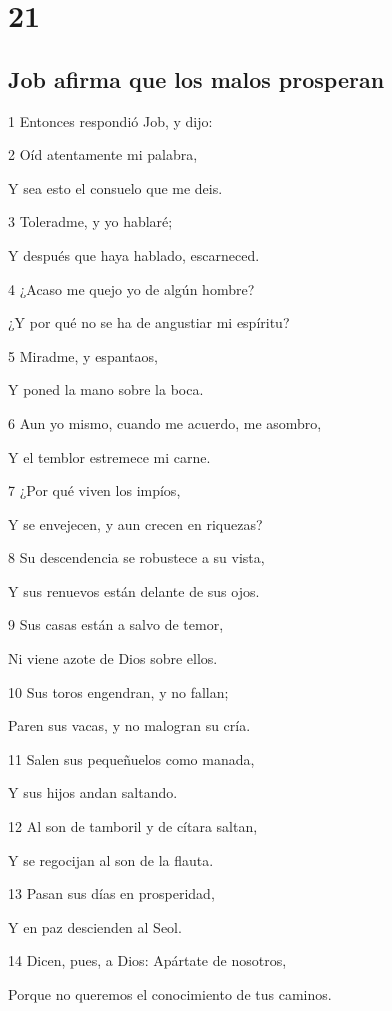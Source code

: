 \chapter{21}

\section*{Job afirma que los malos prosperan}

\par 1 Entonces respondió Job, y dijo:
\par 2 Oíd atentamente mi palabra,
\par Y sea esto el consuelo que me deis.
\par 3 Toleradme, y yo hablaré;
\par Y después que haya hablado, escarneced.
\par 4 ¿Acaso me quejo yo de algún hombre?
\par ¿Y por qué no se ha de angustiar mi espíritu?
\par 5 Miradme, y espantaos,
\par Y poned la mano sobre la boca.
\par 6 Aun yo mismo, cuando me acuerdo, me asombro,
\par Y el temblor estremece mi carne.
\par 7 ¿Por qué viven los impíos,
\par Y se envejecen, y aun crecen en riquezas?
\par 8 Su descendencia se robustece a su vista,
\par Y sus renuevos están delante de sus ojos.
\par 9 Sus casas están a salvo de temor,
\par Ni viene azote de Dios sobre ellos.
\par 10 Sus toros engendran, y no fallan;
\par Paren sus vacas, y no malogran su cría.
\par 11 Salen sus pequeñuelos como manada,
\par Y sus hijos andan saltando.
\par 12 Al son de tamboril y de cítara saltan,
\par Y se regocijan al son de la flauta.
\par 13 Pasan sus días en prosperidad,
\par Y en paz descienden al Seol.
\par 14 Dicen, pues, a Dios: Apártate de nosotros,
\par Porque no queremos el conocimiento de tus caminos.
